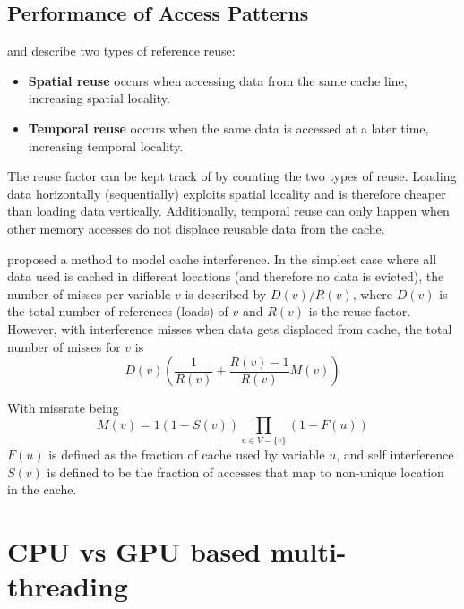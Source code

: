\subsection{Performance of Access Patterns}
\citeauthor{lam1991cache} and \citeauthor{meyer2003algorithms} describe two types of reference reuse\cite{lam1991cache, meyer2003algorithms}:
\begin{itemize}
    \item \textbf{Spatial reuse} occurs when accessing data from the same cache line, increasing spatial locality.
    \item \textbf{Temporal reuse} occurs when the same data is accessed at a later time, increasing temporal locality.
\end{itemize}
The reuse factor can be kept track of by counting the two types of reuse.
Loading data horizontally (sequentially) exploits spatial locality and is therefore cheaper than loading data vertically.
Additionally, temporal reuse can only happen when other memory accesses do not displace reusable data from the cache.

\citeauthor{lam1991cache} proposed a method to model cache interference.
In the simplest case where all data used is cached in different locations (and therefore no data is evicted), the number of misses per variable $v$ is described by $D(v)/R(v)$, where $D(v)$ is the total number of references (loads) of $v$ and $R(v)$ is the reuse factor.
However, with interference misses when data gets displaced from cache, the total number of misses for $v$ is
\[
    D(v)\left(\frac{1}{R(v)}+\frac{R(v)-1}{R(v)}M(v)\right)
\]

With missrate being
\[
    M(v) = 1 \left(1 - S(v)\right) \prod_{u\in V - \{v\}}\left(1 - F(u)\right)
\]
$F(u)$ is defined as the fraction of cache used by variable $u$, and self interference $S(v)$ is defined to be the fraction of accesses that map to non-unique location in the cache.



\section{CPU vs GPU based multi-threading}

